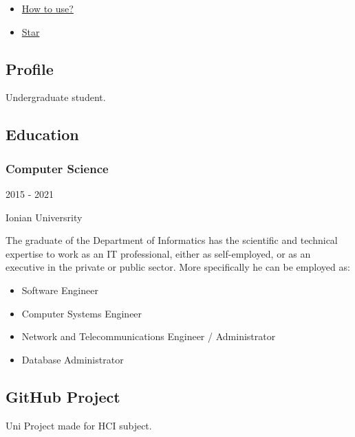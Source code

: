 \documentclass[english,]{article}
\providecommand{\tightlist}{%
  \setlength{\itemsep}{0pt}\setlength{\parskip}{0pt}}
\begin{document}
\begin{itemize}
\tightlist
\item
  \href{https://www.youtube.com/watch?v=Jnmj1dXDbNk}{How to use?}
\item
  \href{https://github.com/sharu725/online-cv}{Star}
\end{itemize}

\hypertarget{profile}{%
\subsection{\texorpdfstring{{ \emph{} \emph{} }
Profile}{    Profile}}\label{profile}}

Undergraduate student.

\hypertarget{education}{%
\subsection{\texorpdfstring{{ \emph{} \emph{} }
Education}{    Education}}\label{education}}

\hypertarget{computer-science}{%
\subsubsection{Computer Science}\label{computer-science}}

2015 - 2021

Ionian Universrity

The graduate of the Department of Informatics has the scientific and
technical expertise to work as an IT professional, either as
self-employed, or as an executive in the private or public sector. More
specifically he can be employed as:

\begin{itemize}
\tightlist
\item
  Software Engineer
\item
  Computer Systems Engineer
\item
  Network and Telecommunications Engineer / Administrator
\item
  Database Administrator
\end{itemize}

\hypertarget{github-project}{%
\subsection{\texorpdfstring{{ \emph{} \emph{} } GitHub
Project}{    GitHub Project}}\label{github-project}}

Uni Project made for HCI subject.
\end{document}
